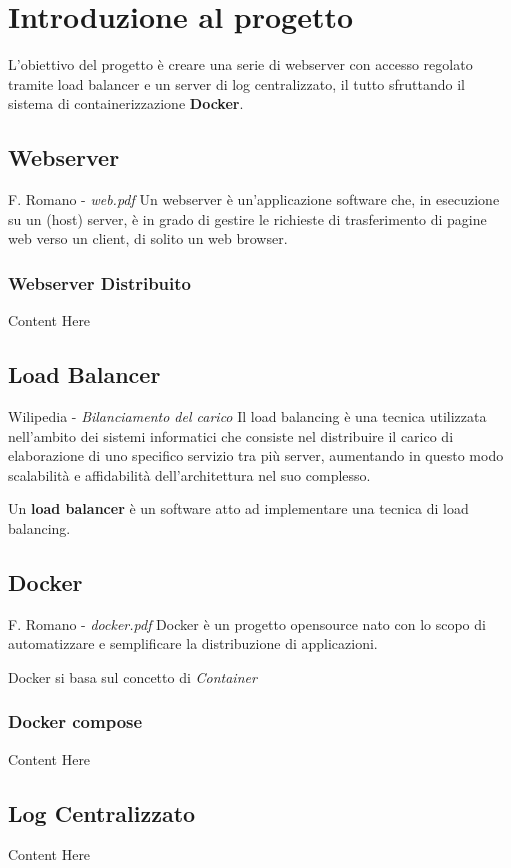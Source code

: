 \documentclass[../DocumentazioneProgetto.tex]{subfiles}
\begin{document}
	\section{Introduzione al progetto}
	L'obiettivo del progetto è creare una serie di webserver con accesso regolato tramite load balancer e un server di log centralizzato, il tutto sfruttando il sistema di containerizzazione \textbf{Docker}.
	\subsection{Webserver} 
	\begin{aquote}{F. Romano - \textit{web.pdf}}
		Un webserver è un'applicazione software che, in esecuzione su un (host) server, è in grado di gestire le richieste di trasferimento di pagine web verso un client, di solito un web browser.
	\end{aquote}
	\subsubsection{Webserver Distribuito} 
	\label{sec:webserverDistribuito}
	Content Here
	\subsection{Load Balancer}
	\begin{aquote}{Wilipedia - \textit{Bilanciamento del carico}}
	Il load balancing è una tecnica utilizzata nell'ambito dei sistemi informatici che consiste nel distribuire il carico di elaborazione di uno specifico servizio tra più server, aumentando in questo modo scalabilità e affidabilità dell'architettura nel suo complesso.
	\end{aquote}
	Un \textbf{load balancer} è un software atto ad implementare una tecnica di load balancing. 
	\subsection{Docker} 
	\begin{aquote}{F. Romano - \textit{docker.pdf}}
		Docker è un progetto opensource nato con lo scopo di automatizzare e semplificare la distribuzione di applicazioni.
	\end{aquote}
	Docker si basa sul concetto di \textit{Container} 
	\subsubsection{Docker compose} 
	Content Here
	\subsection{Log Centralizzato} 
	Content Here
\end{document}
